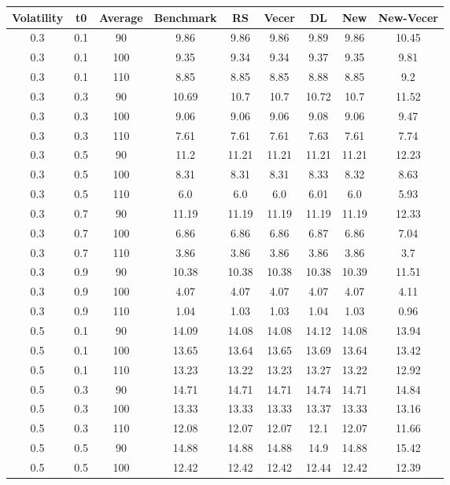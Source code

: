 \documentclass{article}
\begin{document}
\begin{table}[H]
  \begin{tabular}{|c|c|c|c|c|c|c|c|c|}
  \hline
  Volatility & t0 & Average & Benchmark & RS & Vecer & DL & New & New-Vecer \\
  \hline
  0.3 & 0.1 & 90 & 9.86 & 9.86 & 9.86 & 9.89 & 9.86 & 10.45 \\
  0.3 & 0.1 & 100 & 9.35 & 9.34 & 9.34 & 9.37 & 9.35 & 9.81 \\
  0.3 & 0.1 & 110 & 8.85 & 8.85 & 8.85 & 8.88 & 8.85 & 9.2 \\
  0.3 & 0.3 & 90 & 10.69 & 10.7 & 10.7 & 10.72 & 10.7 & 11.52 \\
  0.3 & 0.3 & 100 & 9.06 & 9.06 & 9.06 & 9.08 & 9.06 & 9.47 \\
  0.3 & 0.3 & 110 & 7.61 & 7.61 & 7.61 & 7.63 & 7.61 & 7.74 \\
  0.3 & 0.5 & 90 & 11.2 & 11.21 & 11.21 & 11.21 & 11.21 & 12.23 \\
  0.3 & 0.5 & 100 & 8.31 & 8.31 & 8.31 & 8.33 & 8.32 & 8.63 \\
  0.3 & 0.5 & 110 & 6.0 & 6.0 & 6.0 & 6.01 & 6.0 & 5.93 \\
  0.3 & 0.7 & 90 & 11.19 & 11.19 & 11.19 & 11.19 & 11.19 & 12.33 \\
  0.3 & 0.7 & 100 & 6.86 & 6.86 & 6.86 & 6.87 & 6.86 & 7.04 \\
  0.3 & 0.7 & 110 & 3.86 & 3.86 & 3.86 & 3.86 & 3.86 & 3.7 \\
  0.3 & 0.9 & 90 & 10.38 & 10.38 & 10.38 & 10.38 & 10.39 & 11.51 \\
  0.3 & 0.9 & 100 & 4.07 & 4.07 & 4.07 & 4.07 & 4.07 & 4.11 \\
  0.3 & 0.9 & 110 & 1.04 & 1.03 & 1.03 & 1.04 & 1.03 & 0.96 \\
  0.5 & 0.1 & 90 & 14.09 & 14.08 & 14.08 & 14.12 & 14.08 & 13.94 \\
  0.5 & 0.1 & 100 & 13.65 & 13.64 & 13.65 & 13.69 & 13.64 & 13.42 \\
  0.5 & 0.1 & 110 & 13.23 & 13.22 & 13.23 & 13.27 & 13.22 & 12.92 \\
  0.5 & 0.3 & 90 & 14.71 & 14.71 & 14.71 & 14.74 & 14.71 & 14.84 \\
  0.5 & 0.3 & 100 & 13.33 & 13.33 & 13.33 & 13.37 & 13.33 & 13.16 \\
  0.5 & 0.3 & 110 & 12.08 & 12.07 & 12.07 & 12.1 & 12.07 & 11.66 \\
  0.5 & 0.5 & 90 & 14.88 & 14.88 & 14.88 & 14.9 & 14.88 & 15.42 \\
  0.5 & 0.5 & 100 & 12.42 & 12.42 & 12.42 & 12.44 & 12.42 & 12.39 \\

\end{tabular}
\end{table}
\end{document}
